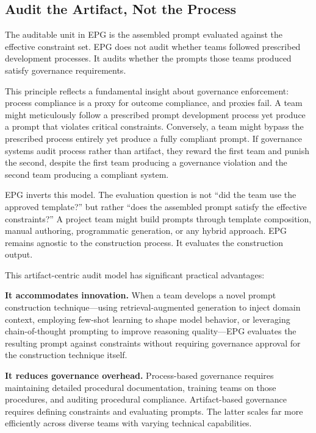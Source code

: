 \subsection{Audit the Artifact, Not the Process}


The auditable unit in EPG is the assembled prompt evaluated against the effective constraint set. EPG does not audit whether teams followed prescribed development processes. It audits whether the prompts those teams produced satisfy governance requirements.

This principle reflects a fundamental insight about governance enforcement: process compliance is a proxy for outcome compliance, and proxies fail. A team might meticulously follow a prescribed prompt development process yet produce a prompt that violates critical constraints. Conversely, a team might bypass the prescribed process entirely yet produce a fully compliant prompt. If governance systems audit process rather than artifact, they reward the first team and punish the second, despite the first team producing a governance violation and the second team producing a compliant system.

EPG inverts this model. The evaluation question is not ``did the team use the approved template?'' but rather ``does the assembled prompt satisfy the effective constraints?'' A project team might build prompts through template composition, manual authoring, programmatic generation, or any hybrid approach. EPG remains agnostic to the construction process. It evaluates the construction output.

This artifact-centric audit model has significant practical advantages:

\textbf{It accommodates innovation.} When a team develops a novel prompt construction technique---using retrieval-augmented generation to inject domain context, employing few-shot learning to shape model behavior, or leveraging chain-of-thought prompting to improve reasoning quality---EPG evaluates the resulting prompt against constraints without requiring governance approval for the construction technique itself.

\textbf{It reduces governance overhead.} Process-based governance requires maintaining detailed procedural documentation, training teams on those procedures, and auditing procedural compliance. Artifact-based governance requires defining constraints and evaluating prompts. The latter scales far more efficiently across diverse teams with varying technical capabilities.

